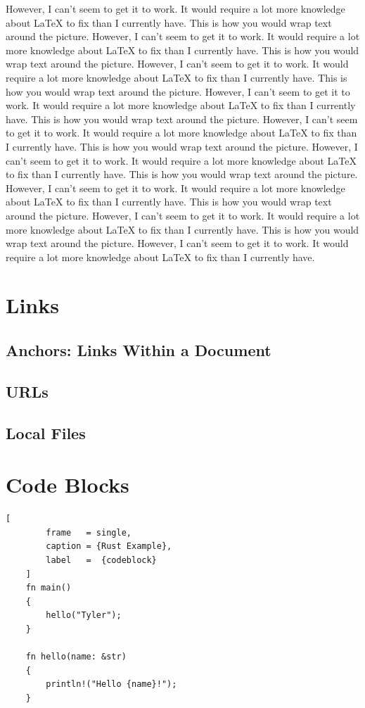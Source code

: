 \documentclass{article}
\begin{document}
    However, I can't seem to get it to work. It would require
    a lot more knowledge about {\LaTeX} to fix than I 
    currently have. This is how you would wrap text around the picture.
    However, I can't seem to get it to work. It would require
    a lot more knowledge about {\LaTeX} to fix than I currently have.
    This is how you would wrap text around the picture. However, I 
    can't seem to get it to work. It would require
    a lot more knowledge about {\LaTeX} to fix than I 
    currently have.
    This is how you would wrap text around the picture.
    However, I can't seem to get it to work. It would require
    a lot more knowledge about {\LaTeX} to fix than I 
    currently have. This is how you would wrap text around the picture.
    However, I can't seem to get it to work. It would require
    a lot more knowledge about {\LaTeX} to fix than I currently have.
    This is how you would wrap text around the picture. However, I 
    can't seem to get it to work. It would require
    a lot more knowledge about {\LaTeX} to fix than I 
    currently have.
    This is how you would wrap text around the picture.
    However, I can't seem to get it to work. It would require
    a lot more knowledge about {\LaTeX} to fix than I 
    currently have. This is how you would wrap text around the picture.
    However, I can't seem to get it to work. It would require
    a lot more knowledge about {\LaTeX} to fix than I currently have.
    This is how you would wrap text around the picture. However, I 
    can't seem to get it to work. It would require
    a lot more knowledge about {\LaTeX} to fix than I 
    currently have.

\section{Links}
    \subsection{Anchors: Links Within a Document}
    \lipsum[1-1]
    \subsection{URLs}
    \lipsum[1-1]
    \subsection{Local Files}
    \lipsum[1-1]

\section{Code Blocks}
    \begin{lstlisting}[
        frame   = single,
        caption = {Rust Example},
        label   =  {codeblock}
    ]
    fn main()
    {
        hello("Tyler");
    }

    fn hello(name: &str)
    {
        println!("Hello {name}!");
    }
    \end{lstlisting}
\end{document}
